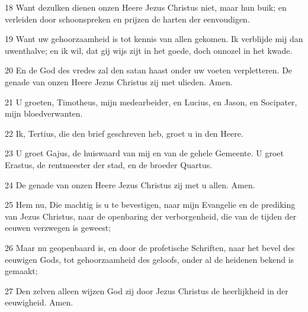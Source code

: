 \par 18 Want dezulken dienen onzen Heere Jezus Christus niet, maar hun buik; en verleiden door schoonspreken en prijzen de harten der eenvoudigen.
\par 19 Want uw gehoorzaamheid is tot kennis van allen gekomen. Ik verblijde mij dan uwenthalve; en ik wil, dat gij wijs zijt in het goede, doch onnozel in het kwade.
\par 20 En de God des vredes zal den satan haast onder uw voeten verpletteren. De genade van onzen Heere Jezus Christus zij met ulieden. Amen.
\par 21 U groeten, Timotheus, mijn medearbeider, en Lucius, en Jason, en Socipater, mijn bloedverwanten.
\par 22 Ik, Tertius, die den brief geschreven heb, groet u in den Heere.
\par 23 U groet Gajus, de huiswaard van mij en van de gehele Gemeente. U groet Erastus, de rentmeester der stad, en de broeder Quartus.
\par 24 De genade van onzen Heere Jezus Christus zij met u allen. Amen.
\par 25 Hem nu, Die machtig is u te bevestigen, naar mijn Evangelie en de prediking van Jezus Christus, naar de openbaring der verborgenheid, die van de tijden der eeuwen verzwegen is geweest;
\par 26 Maar nu geopenbaard is, en door de profetische Schriften, naar het bevel des eeuwigen Gods, tot gehoorzaamheid des geloofs, onder al de heidenen bekend is gemaakt;
\par 27 Den zelven alleen wijzen God zij door Jezus Christus de heerlijkheid in der eeuwigheid. Amen.




